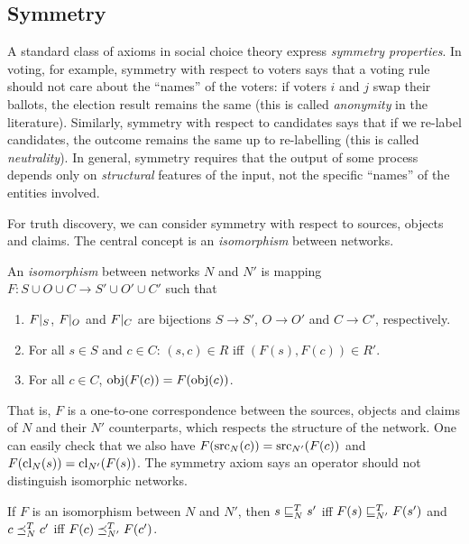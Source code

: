 \subsection{Symmetry}

A standard class of axioms in social choice theory express \emph{symmetry
properties}. In voting, for example, symmetry with respect to voters says that
a voting rule should not care about the ``names'' of the voters: if voters $i$
and $j$ swap their ballots, the election result remains the same (this is
called \emph{anonymity} in the literature). Similarly, symmetry with respect to
candidates says that if we re-label candidates, the outcome remains the same up
to re-labelling (this is called \emph{neutrality}). In general, symmetry
requires that the output of some process depends only on \emph{structural}
features of the input, not the specific ``names'' of the entities involved.

For truth discovery, we can consider symmetry with respect to sources, objects
and claims. The central concept is an \emph{isomorphism} between networks.

\begin{definition}
    An \emph{isomorphism} between networks $N$ and $N'$ is mapping $F: S \cup O
    \cup C \to S' \cup O' \cup C'$ such that
    \begin{enumerate}
        \item $F|_{S}$, $F|_{O}$ and $F|_{C}$ are
              bijections $S \to S'$, $O \to O'$ and $C \to C'$, respectively.
        \item For all $s \in S$ and $c \in C$: $(s, c) \in R$ iff $(F(s), F(c))
              \in R'$.
        \item For all $c \in C$, $\operatorname{obj}(F(c)) = F(\operatorname{obj}(c))$.
    \end{enumerate}
\end{definition}

That is, $F$ is a one-to-one correspondence between the sources, objects and
claims of $N$ and their $N'$ counterparts, which respects the structure of the
network. One can easily check that we also have $F(\operatorname{src}_N(c)) =
\operatorname{src}_{N'}(F(c))$ and $F(\operatorname{cl}_N(s)) = \operatorname{cl}_{N'}(F(s))$.
%
The symmetry axiom says an operator should not distinguish isomorphic networks.

\begin{axiom}[\symmetry{}]
    If $F$ is an isomorphism between $N$ and $N'$, then
    $s \sqsubseteq_N^T s'$ iff $F(s) \sqsubseteq_{N'}^T F(s')$ and $c \preceq_N^T c'$ iff $F(c)
    \preceq_{N'}^T F(c')$.
\end{axiom}

